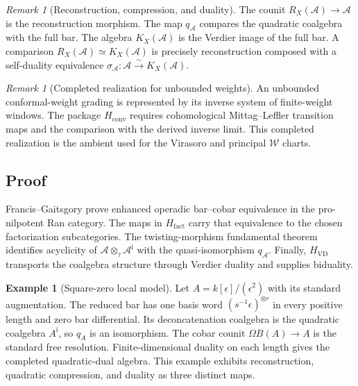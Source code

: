 \documentclass[11pt]{article}
\theoremstyle{plain}
\theoremstyle{definition}
\newtheorem{example}[theorem]{Example}
\theoremstyle{remark}
\newtheorem{remark}[theorem]{Remark}
\newcommand{\cA}{\mathcal{A}}
\newcommand{\cW}{\mathcal{W}}
\begin{document}
\begin{remark}[Reconstruction, compression, and duality]
\label{rem:T1-threeway}
The counit $R_X(\cA)\to\cA$ is the reconstruction morphism.  The map
$q_\cA$ compares the quadratic coalgebra with the full bar.  The
algebra $K_X(\cA)$ is the Verdier image of the full bar.  A comparison
$R_X(\cA)\simeq K_X(\cA)$ is precisely reconstruction composed with
a self-duality equivalence
$\sigma_\cA\colon\cA\xrightarrow{\sim}K_X(\cA)$.
\end{remark}

\begin{remark}[Completed realization for unbounded weights]
\label{rem:T1a-ambient-classM}
An unbounded conformal-weight grading is represented by its inverse
system of finite-weight windows.  The package $H_{\mathrm{conv}}$
requires cohomological Mittag--Leffler transition maps and the
comparison with the derived inverse limit.  This completed realization
is the ambient used for the Virasoro and principal $\cW$ charts.
\end{remark}

\subsection{Proof}

Francis--Gaitsgory prove enhanced operadic bar--cobar equivalence in
the pro-nilpotent Ran category.  The maps in $H_{\mathrm{fact}}$
carry that equivalence to the chosen factorization subcategories.
The twisting-morphism fundamental theorem identifies acyclicity of
$\cA\otimes_{\tau}\cA^{\mathrm i}$ with the quasi-isomorphism
$q_\cA$.  Finally, $H_{\mathrm{VD}}$ transports the coalgebra
structure through Verdier duality and supplies biduality.

\begin{example}[Square-zero local model]\label{ex:thmA-heis}
Let $A=k[\epsilon]/(\epsilon^2)$ with its standard augmentation.  The
reduced bar has one basis word $(s^{-1}\epsilon)^{\otimes r}$ in every
positive length and zero bar differential.  Its deconcatenation
coalgebra is the quadratic coalgebra $A^{\mathrm i}$, so $q_A$ is an
isomorphism.  The cobar counit $\Omega B(A)\to A$ is the standard
free resolution.  Finite-dimensional duality on each length gives
the completed quadratic-dual algebra.  This example exhibits
reconstruction, quadratic compression, and duality as three distinct
maps.
\end{example}


\end{document}
